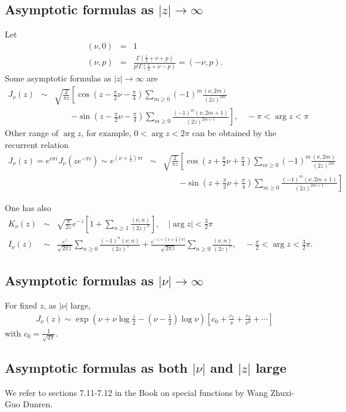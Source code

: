 \documentclass[11pt,reqno]{amsart}
\newcommand{\bna}{\begin{eqnarray*}}
\newcommand{\ena}{\end{eqnarray*}}
\theoremstyle{definition}
\begin{document}
\subsection{Asymptotic formulas as $|z|\rightarrow\infty$}
Let
\bna
(\nu,0)&=&1\\
(\nu,p)&=&\frac{\Gamma(\frac{1}{2}+\nu+p)}{p!\Gamma(\frac{1}{2}+\nu-p)}=(-\nu,p).
\ena
Some asymptotic formulas as $|z|\rightarrow\infty$ are
\bna
J_\nu(z)&\sim& \sqrt{\frac{2}{\pi z}}
\left[\cos(z-\frac{\pi}{2}\nu-\frac{\pi}{4})\sum_{m\geq 0}(-1)^m\frac{(\nu,2m)}{(2z)^{2m}}
\right.\\
&&\qquad\left.
-\sin(z-\frac{\pi}{2}\nu-\frac{\pi}{4})
\sum_{m\geq 0}\frac{(-1)^m(\nu,2m+1)}{(2z)^{2m+1}}
\right],\quad -\pi<\arg z<\pi
\ena
Other range of $\arg z$, for example, $0<\arg z<2\pi$ can be obtained by the  recurrent relation
\bna
J_\nu(z)=e^{\nu\pi i}J_{\nu}(ze^{-\pi i})
\sim e^{(\nu+\frac{1}{2})\pi i}
&\sim& \sqrt{\frac{2}{\pi z}}
\left[\cos(z+\frac{\pi}{2}\nu+\frac{\pi}{4})\sum_{m\geq 0}(-1)^m\frac{(\nu,2m)}{(2z)^{2m}}
\right.\\
&&\qquad\left.
-\sin(z+\frac{\pi}{2}\nu+\frac{\pi}{4})
\sum_{m\geq 0}\frac{(-1)^m(\nu,2m+1)}{(2z)^{2m+1}}
\right]
\ena

One has also
\bna
K_\nu(z)&\sim& \sqrt{\frac{\pi}{2z}} e^{-z}\left[1+\sum_{n\geq 1}\frac{(\nu,n)}{(2z)^n}\right],
\quad |\arg z|<\frac{3}{2}\pi\\
I_\nu(z)&\sim&\frac{e^z}{\sqrt{2\pi z}}
\sum_{n\geq 0}\frac{(-1)^n (\nu,n)}{ (2z)^n}
+\frac{e^{-z+(\nu+\frac{1}{2})\pi i}}{\sqrt{2\pi z}}\sum_{n\geq 0}\frac{(\nu,n)}{(2z)^n},
\quad -\frac{\pi}{2}<\arg z<\frac{3}{2}\pi.
\ena
\subsection{Asymptotic formulas as $|\nu|\rightarrow\infty$ }
For fixed $z$, as $|\nu|$ large,
\bna
J_\nu(z)\sim \exp\left(\nu+\nu\log\frac{z}{2}-(\nu-\frac{1}{2})\log \nu\right)
\left[c_0+\frac{c_1}{\nu}+\frac{c_2}{\nu^2}+\cdots\right]
\ena
with $c_0=\frac{1}{\sqrt{2\pi}}$.

\subsection{Asymptotic formulas as both $|\nu|$ and $|z|$ large}
We refer to sections 7.11-7.12 in the Book on special functions by Wang Zhuxi-Guo Dunren.
\end{document}
